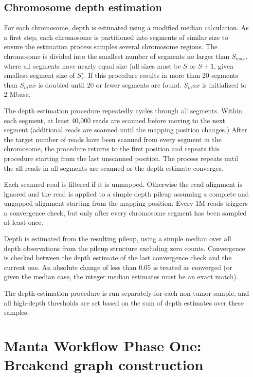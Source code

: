 \documentclass{article}
\begin{document}
\subsection{Chromosome depth estimation}

For each chromosome, depth is estimated using a modified median calculation. As a first step, each chromosome is partitioned into segments of similar size to ensure the estimation process samples several chromosome regions. The chromosome is divided into the smallest number of segments no larger than $S_{max}$, where all segments have nearly equal size (all sizes must be $S$ or $S+1$, given smallest segment size of $S$). If this procedure results in more than 20 segments than $S_max$ is doubled until 20 or fewer segments are found. $S_max$ is initialized to 2 Mbase.

The depth estimation procedure repeatedly cycles through all segments. Within each segment, at least 40,000 reads are scanned before moving to the next segment (additional reads are scanned until the mapping position changes.) After the target number of reads have been scanned from every segment in the chromosome, the procedure returns to the first position and repeats this procedure starting from the last unscanned position. The process repeats until the all reads in all segments are scanned or the depth estimate converges.

Each scanned read is filtered if it is unmapped. Otherwise the read alignment is ignored and the read is applied to a simple depth pileup assuming a complete and ungapped alignment starting from the mapping position. Every 1M reads triggers a convergence check, but only after every chromosome segment has been sampled at least once.

Depth is estimated from the resulting pileup, using a simple median over all depth observations from the pileup structure excluding zero counts. Convergence is checked between the depth estimate of the last convergence check and the current one. An absolute change of less than 0.05 is treated as converged (or given the median case, the integer median estimates must be an exact match).

The depth estimation procedure is run separately for each non-tumor sample, and all high-depth thresholds are set based on the sum of depth estimates over these samples.

\section{Manta Workflow Phase One: Breakend graph construction}
\end{document}

